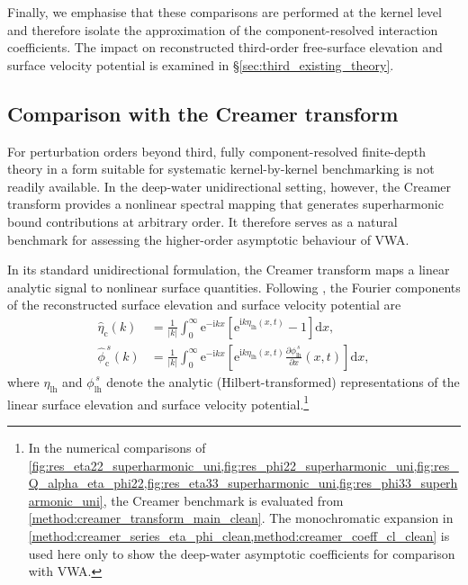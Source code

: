 \documentclass[lineno]{JFM-FLM_Au}
\begin{document}
Finally, we emphasise that these comparisons are performed at the kernel level and therefore isolate the approximation of the component-resolved interaction coefficients. 
The impact on reconstructed third-order free-surface elevation and surface velocity potential is examined in \S\ref{sec:third_existing_theory}.
\subsection{Comparison with the Creamer transform}
\label{method:creamer_comparison}

For perturbation orders beyond third, fully component-resolved finite-depth theory in a form suitable for systematic kernel-by-kernel benchmarking is not readily available. 
In the deep-water unidirectional setting, however, the Creamer transform \citep{creamer1989improved} provides a nonlinear spectral mapping that generates superharmonic bound contributions at arbitrary order. 
It therefore serves as a natural benchmark for assessing the higher-order asymptotic behaviour of VWA.


In its standard unidirectional formulation, the Creamer transform maps a linear analytic signal to nonlinear surface quantities. 
Following \citet{creamer1989improved,gibbs_walls_2004,taylor1998creamer}, the Fourier components of the reconstructed surface elevation and surface velocity potential are
\begin{subequations}\label{method:creamer_transform_main_clean}
\begin{align}
\hat\eta_{\mathrm{c}}(k)
&=\frac{1}{|k|}
\int_{0}^{\infty} 
\mathrm{e}^{-\mathrm{i} k x}
\left[\mathrm{e}^{\mathrm{i} k \eta_{\mathrm{lh}}(x,t)}-1\right]
\mathrm{d} x, 
\\
\hat \phi_{\mathrm{c}}^{\,s}(k)
&=\frac{1}{|k|}
\int_{0}^{\infty} 
\mathrm{e}^{-\mathrm{i} k x}
\left[\mathrm{e}^{\mathrm{i} k \eta_{\mathrm{lh}}(x,t)}
\frac{\partial \phi_{\mathrm{lh}}^{\,s}}{\partial x}(x,t)\right]
\mathrm{d} x,
\end{align}
\end{subequations}
where $\eta_{\mathrm{lh}}$ and $\phi_{\mathrm{lh}}^{\,s}$ denote the analytic (Hilbert-transformed) representations of the linear surface elevation and surface velocity potential.\footnote{In the numerical comparisons of \cref{fig:res_eta22_superharmonic_uni,fig:res_phi22_superharmonic_uni,fig:res_Q_alpha_eta_phi22,fig:res_eta33_superharmonic_uni,fig:res_phi33_superharmonic_uni}, the Creamer benchmark is evaluated from \cref{method:creamer_transform_main_clean}. The monochromatic expansion in \cref{method:creamer_series_eta_phi_clean,method:creamer_coeff_cl_clean} is used here only to show the deep-water asymptotic coefficients for comparison with VWA.} 
\end{document}
